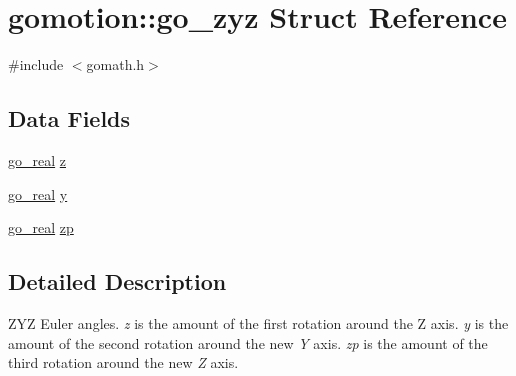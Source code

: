\hypertarget{structgomotion_1_1go__zyz}{\section{gomotion\-:\-:go\-\_\-zyz Struct Reference}
\label{structgomotion_1_1go__zyz}
}


{\ttfamily \#include $<$gomath.\-h$>$}

\subsection*{Data Fields}
\begin{DoxyCompactItemize}
\item 
\hyperlink{gotypes_8h_afd666a2393eebd71ee455846ac9def9b}{go\-\_\-real} \hyperlink{structgomotion_1_1go__zyz_a87a0a9e59da539abece916a52c8b3d28}{z}
\item 
\hyperlink{gotypes_8h_afd666a2393eebd71ee455846ac9def9b}{go\-\_\-real} \hyperlink{structgomotion_1_1go__zyz_a05cbc6e6ea8660a5d3e64eedea4e9fb7}{y}
\item 
\hyperlink{gotypes_8h_afd666a2393eebd71ee455846ac9def9b}{go\-\_\-real} \hyperlink{structgomotion_1_1go__zyz_a43a807cde8f59f25403e282390331001}{zp}
\end{DoxyCompactItemize}


\subsection{Detailed Description}
Z\-Y\-Z Euler angles. {\itshape z} is the amount of the first rotation around the Z axis. {\itshape y} is the amount of the second rotation around the new {\itshape Y} axis. {\itshape zp} is the amount of the third rotation around the new {\itshape Z} axis. 

